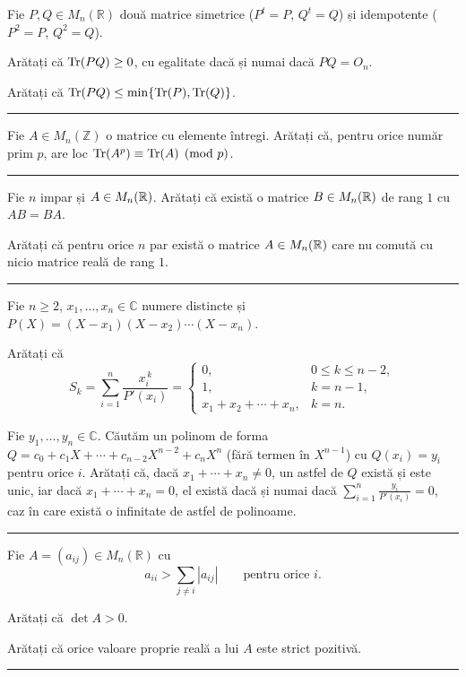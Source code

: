 Fie $P,Q\in M_n(\mathbb{R})$ două matrice simetrice ($P^t=P$, $Q^t=Q$) și idempotente ($P^2=P$, $Q^2=Q$).
\begin{parti}
  \item Arătați că $\operatorname{Tr}(PQ)\ge0$, cu egalitate dacă și numai dacă $PQ=O_n$.
  \item Arătați că $\operatorname{Tr}(PQ)\le\min\{\operatorname{Tr}(P),\operatorname{Tr}(Q)\}$.
\end{parti}
\vspace{1mm}\hrule

Fie $A\in M_n(\mathbb{Z})$ o matrice cu elemente întregi. Arătați că, pentru orice număr prim $p$, are loc $\operatorname{Tr}(A^p)\equiv\operatorname{Tr}(A)\pmod p$.
\vspace{1mm}\hrule

\begin{parti}
\item Fie $n$ impar și $A \in M_n(\mathbb{R})$. Arătați că există o matrice $B \in M_n(\mathbb{R})$ de rang $1$ cu $AB = BA$.

\item Arătați că pentru orice $n$ par există o matrice $A \in M_n(\mathbb{R})$ care nu comută cu nicio matrice reală de rang $1$.
\end{parti}
\vspace{1mm}\hrule

Fie $n\ge2$, $x_1,\dots,x_n\in\mathbb{C}$ numere distincte și $P(X)=(X-x_1)(X-x_2)\cdots(X-x_n)$.
\begin{parti}
  \item Arătați că
  \[ S_k=\sum_{i=1}^n\frac{x_i^{\,k}}{P'(x_i)}=\begin{cases}0,&0\le k\le n-2,\\ 1,&k=n-1,\\ x_1+x_2+\cdots+x_n,&k=n.\end{cases} \]
  \item Fie $y_1,\dots,y_n\in\mathbb{C}$. Căutăm un polinom de forma $Q=c_0+c_1X+\cdots+c_{n-2}X^{n-2}+c_nX^n$ (fără termen în $X^{n-1}$) cu $Q(x_i)=y_i$ pentru orice $i$. Arătați că, dacă $x_1+\cdots+x_n\neq0$, un astfel de $Q$ există și este unic, iar dacă $x_1+\cdots+x_n=0$, el există dacă și numai dacă $\displaystyle\sum_{i=1}^n\frac{y_i}{P'(x_i)}=0$, caz în care există o infinitate de astfel de polinoame.
\end{parti}
\vspace{1mm}\hrule

Fie $A=(a_{ij})\in M_n(\mathbb{R})$ cu
\[ a_{ii}>\sum_{j\neq i}|a_{ij}|\qquad\text{pentru orice } i. \]
\begin{parti}
  \item Arătați că $\det A>0$.
  \item Arătați că orice valoare proprie reală a lui $A$ este strict pozitivă.
\end{parti}
\vspace{1mm}\hrule


